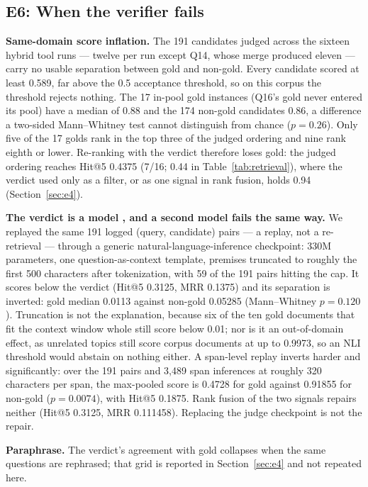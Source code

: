 \subsection{E6: When the verifier fails}
\label{sec:e6}
\label{sec:inflation}\label{sec:eval-verify}   %

\textbf{Same-domain score inflation.}
The 191 candidates judged across the sixteen hybrid tool runs --- twelve
per run except Q14, whose merge produced eleven --- carry no usable
separation between gold and non-gold. Every candidate scored at least
0.589, far above the 0.5 acceptance threshold, so on this corpus the
threshold rejects nothing. The 17 in-pool gold instances (Q16's gold never
entered its pool) have a median of 0.88 and the 174 non-gold candidates
0.86, a difference a two-sided Mann--Whitney test cannot distinguish from
chance ($p = 0.26$). Only five of the 17 golds rank in the top three of
the judged ordering and nine rank eighth or lower. Re-ranking with the
verdict therefore loses gold: the judged ordering reaches Hit@5 0.4375
(7/16; 0.44 in Table~\ref{tab:retrieval}), where the verdict used only as
a filter, or as one signal in rank fusion, holds 0.94
(Section~\ref{sec:e4}).

\textbf{The verdict is a model \cite{laya}, and a second model fails the
same way.}
We replayed the same 191 logged (query, candidate) pairs --- a replay, not
a re-retrieval --- through a generic natural-language-inference
checkpoint: 330M parameters, one question-as-context template, premises
truncated to roughly the first 500 characters after tokenization, with 59
of the 191 pairs hitting the cap. It scores below the verdict (Hit@5
0.3125, MRR 0.1375) and its separation is inverted: gold median 0.0113
against non-gold 0.05285 (Mann--Whitney $p = 0.120$). Truncation is not
the explanation, because six of the ten gold documents that fit the
context window whole still score below 0.01; nor is it an out-of-domain
effect, as unrelated topics still score corpus documents at up to 0.9973,
so an NLI threshold would abstain on nothing either. A span-level replay
inverts harder and significantly: over the 191 pairs and 3{,}489 span
inferences at roughly 320 characters per span, the max-pooled score is
0.4728 for gold against 0.91855 for non-gold ($p = 0.0074$), with Hit@5
0.1875. Rank fusion of the two signals repairs neither (Hit@5 0.3125, MRR
0.111458). Replacing the judge checkpoint is not the repair.

\textbf{Paraphrase.}
The verdict's agreement with gold collapses when the same questions are
rephrased; that grid is reported in Section~\ref{sec:e4} and not repeated
here.

